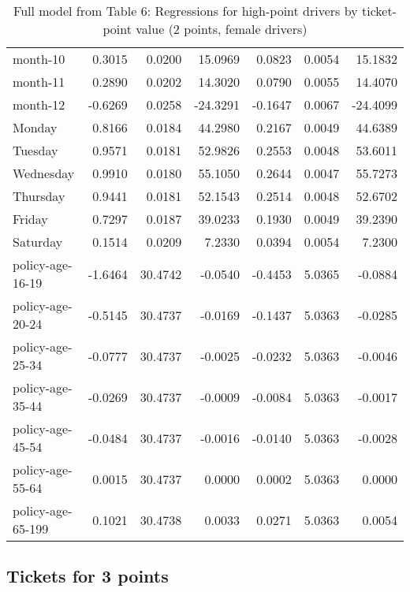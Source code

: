 \documentclass[10pt]{article}
\begin{document}
\begin{table}[ht]
\begin{tabular}{lrrrrrr}
  month-10 & 0.3015 & 0.0200 & 15.0969 & 0.0823 & 0.0054 & 15.1832 \\ 
  month-11 & 0.2890 & 0.0202 & 14.3020 & 0.0790 & 0.0055 & 14.4070 \\ 
  month-12 & -0.6269 & 0.0258 & -24.3291 & -0.1647 & 0.0067 & -24.4099 \\ 
  Monday & 0.8166 & 0.0184 & 44.2980 & 0.2167 & 0.0049 & 44.6389 \\ 
  Tuesday & 0.9571 & 0.0181 & 52.9826 & 0.2553 & 0.0048 & 53.6011 \\ 
  Wednesday & 0.9910 & 0.0180 & 55.1050 & 0.2644 & 0.0047 & 55.7273 \\ 
  Thursday & 0.9441 & 0.0181 & 52.1543 & 0.2514 & 0.0048 & 52.6702 \\ 
  Friday & 0.7297 & 0.0187 & 39.0233 & 0.1930 & 0.0049 & 39.2390 \\ 
  Saturday & 0.1514 & 0.0209 & 7.2330 & 0.0394 & 0.0054 & 7.2300 \\ 
  policy-age-16-19 & -1.6464 & 30.4742 & -0.0540 & -0.4453 & 5.0365 & -0.0884 \\ 
  policy-age-20-24 & -0.5145 & 30.4737 & -0.0169 & -0.1437 & 5.0363 & -0.0285 \\ 
  policy-age-25-34 & -0.0777 & 30.4737 & -0.0025 & -0.0232 & 5.0363 & -0.0046 \\ 
  policy-age-35-44 & -0.0269 & 30.4737 & -0.0009 & -0.0084 & 5.0363 & -0.0017 \\ 
  policy-age-45-54 & -0.0484 & 30.4737 & -0.0016 & -0.0140 & 5.0363 & -0.0028 \\ 
  policy-age-55-64 & 0.0015 & 30.4737 & 0.0000 & 0.0002 & 5.0363 & 0.0000 \\ 
  policy-age-65-199 & 0.1021 & 30.4738 & 0.0033 & 0.0271 & 5.0363 & 0.0054 \\ 
   \hline
\end{tabular}
\caption{Full model from Table 6: Regressions for high-point drivers by ticket-point value (2 points, female drivers)} 
\label{tab_6_2_pts_F}
\end{table}


\clearpage
\pagebreak




\subsection{Tickets for 3 points}
\end{document}
